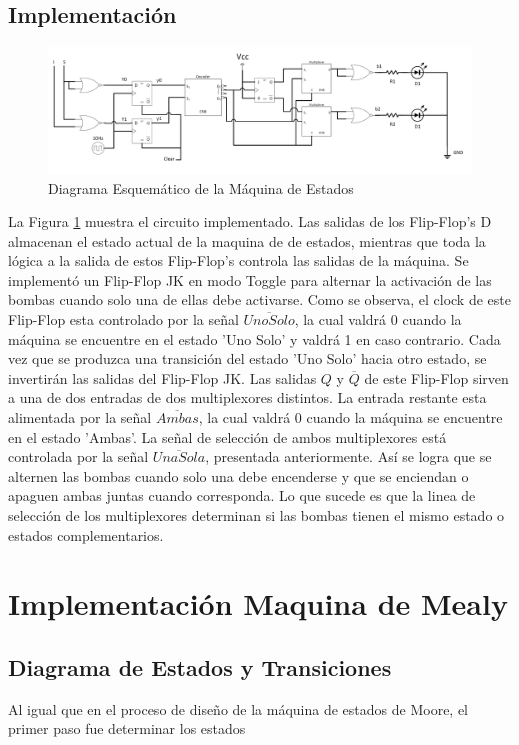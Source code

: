 \documentclass[10pt,a4paper]{article}
\begin{document}
\subsection*{Implementación}
\begin{figure}[H]
\centering
\includegraphics[scale=0.42]{images/diagrama_moore.png}
\caption{Diagrama Esquemático de la Máquina de Estados}
\label{1_fig2}
\end{figure}

La Figura \ref{1_fig2} muestra el circuito implementado. Las salidas de los Flip-Flop's D almacenan el estado actual de la maquina de de estados, mientras que toda la lógica a la salida de estos Flip-Flop's controla las salidas de la máquina.  Se implementó un Flip-Flop JK en modo Toggle para alternar la activación de las bombas cuando solo una de ellas debe activarse. Como se observa, el clock de este Flip-Flop esta controlado por la señal $\overline{Uno Solo}$, la cual valdrá 0 cuando la máquina se encuentre en el estado 'Uno Solo' y valdrá 1 en caso contrario. Cada vez que se produzca una transición del estado 'Uno Solo' hacia otro estado, se invertirán las salidas del Flip-Flop JK. Las salidas $Q$ y $\overline{Q}$ de este Flip-Flop sirven a una de dos entradas de dos multiplexores distintos. La entrada restante esta alimentada por la señal $\overline{Ambas}$, la cual valdrá 0 cuando la máquina se encuentre en el estado 'Ambas'. La señal de selección de ambos multiplexores está controlada por la señal $\overline{Una Sola}$, presentada anteriormente. Así se logra que se alternen las bombas cuando solo una debe encenderse y que se enciendan o apaguen ambas juntas cuando corresponda. Lo que sucede es que la linea de selección de los multiplexores determinan si las bombas tienen el mismo estado o estados complementarios.

\section*{Implementación Maquina de Mealy}
\subsection*{Diagrama de Estados y Transiciones}
Al igual que en el proceso de diseño de la máquina de estados de Moore, el primer paso fue determinar los estados 
\end{document}
